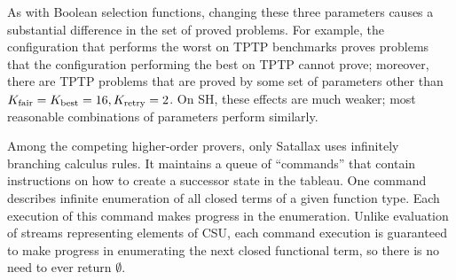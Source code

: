 \documentclass[smallcondensed,draft]{svjour3}     %
\begin{document}
As with Boolean selection functions, changing these three parameters causes
a substantial difference in the set of proved problems. For example, the
configuration that performs the worst on TPTP benchmarks proves 
problems that the configuration performing the best on TPTP cannot prove; moreover, there
are  TPTP problems that are proved by some set of parameters
other than $K_{\mathrm{fair}}=K_{\mathrm{best}}=16, K_{\mathrm{retry}}=2$. On SH, these
effects are much weaker; most reasonable combinations
of parameters perform similarly.

Among the competing higher-order provers, only Satallax uses infinitely
branching calculus rules. It maintains a queue of ``commands'' that contain
instructions on how to create a successor state in the tableau. One
command describes infinite enumeration of all closed terms of a given function
type. Each execution of this command makes progress in the enumeration. Unlike
evaluation of streams representing elements of CSU, each command execution
is guaranteed to make progress in enumerating the next closed functional
term, so there is no need to ever return $\emptyset$.
\end{document}
